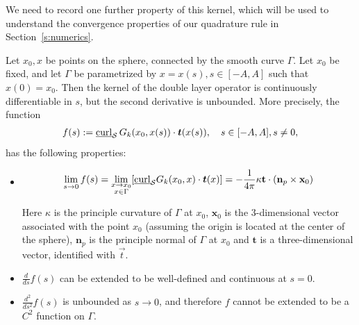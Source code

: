 We need to record one further property of this kernel, which will be
used to understand the convergence properties of our quadrature rule in
Section~\ref{s:numerics}.

\begin{lemma}
\label{regularity}
Let $x_0,x$ be points on the sphere, connected by the smooth curve
$\Gamma$. Let $x_0$ be fixed, and let $\Gamma$ be parametrized by
$x=x(s), s\in[-A,A]$ such that $x(0)=x_{0}$. Then the kernel of the
double layer operator is continuously differentiable in $s$, but the
second derivative is unbounded. More precisely, the function 
\begin{align*}
  f(s):=\underline{\mbox{curl}}_{\S}\,
    G_{k}(x_0,x(s))\cdot\vec{t}(x(s)), \quad s\in[-A,A], s \neq 0,
\end{align*}
has the following properties:
\begin{itemize}
\item 
\begin{align*} 
  \lim_{\substack {s \rightarrow 0}} f(s) = 
   \lim_{\substack {x \rightarrow x_{0} \\ x \in \Gamma}}
   [\underline{\mbox{curl}}_{\S}G_{k}(x_{0},x) \cdot \vec{t}(x)] =  
   -\frac{1}{4\pi} \kappa \mathbf{t}\cdot(\mathbf{n}_{p}
    \times \mathbf{x}_0)
\end{align*}

Here $\kappa$ is the principle curvature of $\Gamma$ at $x_{0}$,
$\mathbf{x}_0$ is the 3-dimensional vector associated with the point
$x_0$ (assuming the origin is located at the center of the sphere),
$\mathbf{n}_p$ is the principle normal of $\Gamma$ at $x_0$ and
$\mathbf{t}$ is a three-dimensional vector, identified with $\vec{t}$.
\item $\frac{d}{ds}f(s)$ can be extended to be well-defined and
continuous at $s=0$.
\item $\frac{d^2}{ds^2} f(s)$ is unbounded as $s\rightarrow 0$, and
therefore $f$ cannot be extended to be a $C^{2}$ function on $\Gamma$.
\end{itemize}
\end{lemma}

